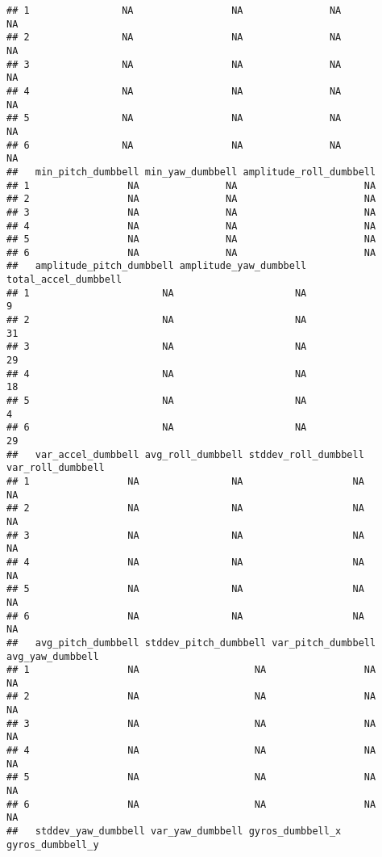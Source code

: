 \documentclass[]{article}
\begin{document}
\begin{verbatim}
## 1                NA                 NA               NA                NA
## 2                NA                 NA               NA                NA
## 3                NA                 NA               NA                NA
## 4                NA                 NA               NA                NA
## 5                NA                 NA               NA                NA
## 6                NA                 NA               NA                NA
##   min_pitch_dumbbell min_yaw_dumbbell amplitude_roll_dumbbell
## 1                 NA               NA                      NA
## 2                 NA               NA                      NA
## 3                 NA               NA                      NA
## 4                 NA               NA                      NA
## 5                 NA               NA                      NA
## 6                 NA               NA                      NA
##   amplitude_pitch_dumbbell amplitude_yaw_dumbbell total_accel_dumbbell
## 1                       NA                     NA                    9
## 2                       NA                     NA                   31
## 3                       NA                     NA                   29
## 4                       NA                     NA                   18
## 5                       NA                     NA                    4
## 6                       NA                     NA                   29
##   var_accel_dumbbell avg_roll_dumbbell stddev_roll_dumbbell var_roll_dumbbell
## 1                 NA                NA                   NA                NA
## 2                 NA                NA                   NA                NA
## 3                 NA                NA                   NA                NA
## 4                 NA                NA                   NA                NA
## 5                 NA                NA                   NA                NA
## 6                 NA                NA                   NA                NA
##   avg_pitch_dumbbell stddev_pitch_dumbbell var_pitch_dumbbell avg_yaw_dumbbell
## 1                 NA                    NA                 NA               NA
## 2                 NA                    NA                 NA               NA
## 3                 NA                    NA                 NA               NA
## 4                 NA                    NA                 NA               NA
## 5                 NA                    NA                 NA               NA
## 6                 NA                    NA                 NA               NA
##   stddev_yaw_dumbbell var_yaw_dumbbell gyros_dumbbell_x gyros_dumbbell_y

\end{verbatim}
\end{document}
